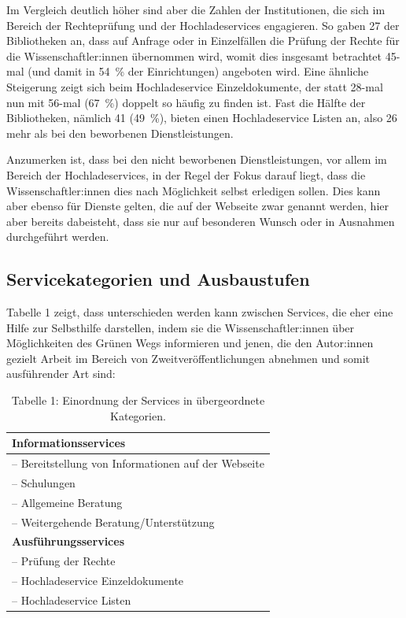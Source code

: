 \documentclass[a4paper,
fontsize=11pt,
oneside,
numbers=noperiodatend,
parskip=half-,
bibliography=totoc,
final
]{scrartcl}
\begin{document}
Im Vergleich deutlich höher sind aber die Zahlen der Institutionen, die
sich im Bereich der Rechteprüfung und der Hochladeservices engagieren.
So gaben 27 der Bibliotheken an, dass auf Anfrage oder in Einzelfällen
die Prüfung der Rechte für die Wissenschaftler:innen übernommen wird,
womit dies insgesamt betrachtet 45-mal (und damit in 54~\% der
Einrichtungen) angeboten wird. Eine ähnliche Steigerung zeigt sich beim
Hochladeservice Einzeldokumente, der statt 28-mal nun mit 56-mal (67~\%)
doppelt so häufig zu finden ist. Fast die Hälfte der Bibliotheken,
nämlich 41 (49~\%), bieten einen Hochladeservice Listen an, also 26 mehr
als bei den beworbenen Dienstleistungen.

Anzumerken ist, dass bei den nicht beworbenen Dienstleistungen, vor
allem im Bereich der Hochladeservices, in der Regel der Fokus darauf
liegt, dass die Wissenschaftler:innen dies nach Möglichkeit selbst
erledigen sollen. Dies kann aber ebenso für Dienste gelten, die auf der
Webseite zwar genannt werden, hier aber bereits dabeisteht, dass sie nur
auf besonderen Wunsch oder in Ausnahmen durchgeführt werden.

\hypertarget{servicekategorien-und-ausbaustufen}{%
\subsection{Servicekategorien und
Ausbaustufen}\label{servicekategorien-und-ausbaustufen}}

Tabelle 1 zeigt, dass unterschieden werden kann zwischen Services, die
eher eine Hilfe zur Selbsthilfe darstellen, indem sie die
Wissenschaftler:innen über Möglichkeiten des Grünen Wegs informieren und
jenen, die den Autor:innen gezielt Arbeit im Bereich von
Zweitveröffentlichungen abnehmen und somit ausführender Art sind:

\begin{table}[h!] 
\centering
\caption{Tabelle 1: Einordnung der Services in übergeordnete Kategorien.}
    \begin{tabular}{l}
    \toprule
\textbf{Informationsservices} \\
\midrule
-- Bereitstellung von Informationen auf der Webseite \\
-- Schulungen \\
-- Allgemeine Beratung \\
-- Weitergehende Beratung/Unterstützung \\
\midrule
\textbf{Ausführungsservices} \\
\midrule
-- Prüfung der Rechte \\
-- Hochladeservice Einzeldokumente \\
-- Hochladeservice Listen \\
\bottomrule
\end{tabular}
\end{table}
\end{document}
